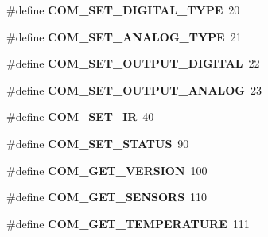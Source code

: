 \begin{DoxyCompactItemize}
\item 
\hypertarget{group___engduino_protocol_ga00602784fc6a871039642faf917bc1b4}{}\#define {\bfseries C\+O\+M\+\_\+\+S\+E\+T\+\_\+\+D\+I\+G\+I\+T\+A\+L\+\_\+\+T\+Y\+P\+E}~20\label{group___engduino_protocol_ga00602784fc6a871039642faf917bc1b4}

\item 
\hypertarget{group___engduino_protocol_ga7096976025554b888271dac1a94c0f26}{}\#define {\bfseries C\+O\+M\+\_\+\+S\+E\+T\+\_\+\+A\+N\+A\+L\+O\+G\+\_\+\+T\+Y\+P\+E}~21\label{group___engduino_protocol_ga7096976025554b888271dac1a94c0f26}

\item 
\hypertarget{group___engduino_protocol_gab4256b842ab397c49007bee04641ffbf}{}\#define {\bfseries C\+O\+M\+\_\+\+S\+E\+T\+\_\+\+O\+U\+T\+P\+U\+T\+\_\+\+D\+I\+G\+I\+T\+A\+L}~22\label{group___engduino_protocol_gab4256b842ab397c49007bee04641ffbf}

\item 
\hypertarget{group___engduino_protocol_ga6a8feac4022d07edd3483c43e013a4ad}{}\#define {\bfseries C\+O\+M\+\_\+\+S\+E\+T\+\_\+\+O\+U\+T\+P\+U\+T\+\_\+\+A\+N\+A\+L\+O\+G}~23\label{group___engduino_protocol_ga6a8feac4022d07edd3483c43e013a4ad}

\item 
\hypertarget{group___engduino_protocol_ga0c4c40c25683c982cb3091259659d091}{}\#define {\bfseries C\+O\+M\+\_\+\+S\+E\+T\+\_\+\+I\+R}~40\label{group___engduino_protocol_ga0c4c40c25683c982cb3091259659d091}

\item 
\hypertarget{group___engduino_protocol_ga12b42e8896ffd1470d9e2ca085d0f4f2}{}\#define {\bfseries C\+O\+M\+\_\+\+S\+E\+T\+\_\+\+S\+T\+A\+T\+U\+S}~90\label{group___engduino_protocol_ga12b42e8896ffd1470d9e2ca085d0f4f2}

\item 
\hypertarget{group___engduino_protocol_ga7f1cef9d8de3da524d788fc6e009540c}{}\#define {\bfseries C\+O\+M\+\_\+\+G\+E\+T\+\_\+\+V\+E\+R\+S\+I\+O\+N}~100\label{group___engduino_protocol_ga7f1cef9d8de3da524d788fc6e009540c}

\item 
\hypertarget{group___engduino_protocol_ga5f6af6a2b71d8ca4caa93a714b2880f2}{}\#define {\bfseries C\+O\+M\+\_\+\+G\+E\+T\+\_\+\+S\+E\+N\+S\+O\+R\+S}~110\label{group___engduino_protocol_ga5f6af6a2b71d8ca4caa93a714b2880f2}

\item 
\hypertarget{group___engduino_protocol_ga33bb75393ec2321363d229f3cbed2467}{}\#define {\bfseries C\+O\+M\+\_\+\+G\+E\+T\+\_\+\+T\+E\+M\+P\+E\+R\+A\+T\+U\+R\+E}~111\label{group___engduino_protocol_ga33bb75393ec2321363d229f3cbed2467}


\end{DoxyCompactItemize}
